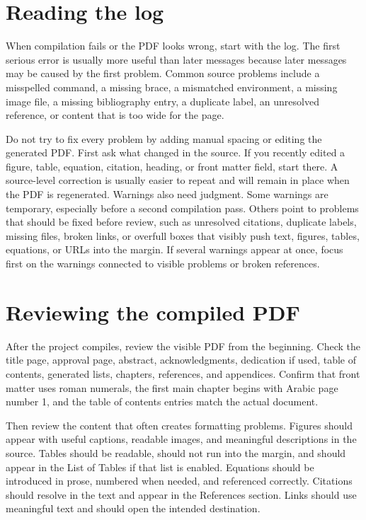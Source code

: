 \section{Reading the log}
\label{sec:reading-log}

When compilation fails or the PDF looks wrong, start with the log. The first serious error is usually more useful than later messages because later messages may be caused by the first problem. Common source problems include a misspelled command, a missing brace, a mismatched environment, a missing image file, a missing bibliography entry, a duplicate label, an unresolved reference, or content that is too wide for the page.

Do not try to fix every problem by adding manual spacing or editing the generated PDF. First ask what changed in the source. If you recently edited a figure, table, equation, citation, heading, or front matter field, start there. A source-level correction is usually easier to repeat and will remain in place when the PDF is regenerated. Warnings also need judgment. Some warnings are temporary, especially before a second compilation pass. Others point to problems that should be fixed before review, such as unresolved citations, duplicate labels, missing files, broken links, or overfull boxes that visibly push text, figures, tables, equations, or URLs into the margin. If several warnings appear at once, focus first on the warnings connected to visible problems or broken references.

\section{Reviewing the compiled PDF}
\label{sec:review-compiled-pdf}

After the project compiles, review the visible PDF from the beginning. Check the title page, approval page, abstract, acknowledgments, dedication if used, table of contents, generated lists, chapters, references, and appendices. Confirm that front matter uses roman numerals, the first main chapter begins with Arabic page number 1, and the table of contents entries match the actual document.

Then review the content that often creates formatting problems. Figures should appear with useful captions, readable images, and meaningful descriptions in the source. Tables should be readable, should not run into the margin, and should appear in the List of Tables if that list is enabled. Equations should be introduced in prose, numbered when needed, and referenced correctly. Citations should resolve in the text and appear in the References section. Links should use meaningful text and should open the intended destination.

